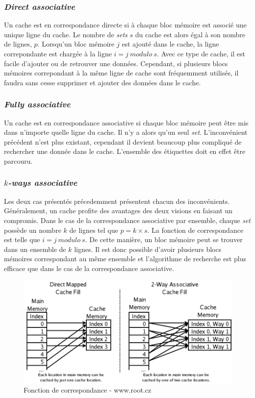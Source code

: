 \subsubsection{\emph{Direct associative}}
Un cache est en correspondance directe si à chaque bloc mémoire est associé une unique ligne du cache. Le nombre de \textit{sets} $s$ du cache est alors égal à son nombre de lignes, $p$. Lorsqu'un bloc mémoire $j$ est ajouté dans le cache, la ligne correpondante est chargée à la ligne $i = j\ modulo\ s$. Avec ce type de cache, il est facile d'ajouter ou de retrouver une données. Cependant, si plusieurs blocs mémoires correpondant à la même ligne de cache sont fréquemment utilisés, il faudra sans cesse supprimer et ajouter des données dans le cache.

\subsubsection{\emph{Fully associative}}
Un cache est en correspondance associative si chaque bloc mémoire peut être mis dans n'importe quelle ligne du cache. Il n'y a alors qu'un seul \textit{set}. L'inconvénient précédent n'est plus existant, cependant il devient beaucoup plus compliqué de rechercher une donnée dans le cache. L'ensemble des étiquettes doit en effet être parcouru.

\subsubsection{\emph{$k$-ways associative}}
Les deux cas présentés précedemment présentent chacun des inconvénients. Généralement, un cache profite des avantages des deux visions en faisant un compromis. Dans le cas de la correspondance associative par ensemble, chaque \textit{set} possède un nombre $k$ de lignes tel que $p=k \times s$. La fonction de correspondance est telle que $i = j\ modulo\ s$. De cette manière, un bloc mémoire peut se trouver dans un ensemble de $k$ lignes. Il est donc possible d'avoir plusieurs blocs mémoires correspondant au même ensemble et l'algorithme de recherche est plus efficace que dans le cas de la correspondance associative.

\begin{figure}[H]
\begin{center}
   \includegraphics[scale=0.60]{images/associative.png}
   \caption{\label{img:associative} Fonction de correspondance - www.root.cz}
\end{center}
\end{figure}

